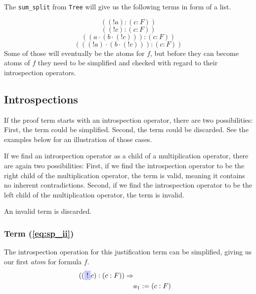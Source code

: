 

The \texttt{sum\_split} from \texttt{Tree} will give us the following terms in form of a list. 

\begin{equation}\label{eq:sp_i}	
	((!a):(c:F))
\end{equation}
\begin{equation}\label{eq:sp_ii}	
	((!c):(c:F))
\end{equation}	
\begin{equation}\label{eq:sp_iii}	
	((a \cdot(b\cdot (! c))):(c:F))											
\end{equation}
\begin{equation}\label{eq:sp_iv}	
	(((! a)\cdot(b\cdot (! c))):(c:F))												
\end{equation}
Some of those will eventually be the atoms for $f$, but before they can become atoms of $f$ they need to be simplified and checked with regard to their introspection operators.

\subsection{Introspections}
If the proof term starts with an introspection operator, there are two possibilities: First, the term could be simplified. Second, the term could be discarded. See the examples below for an illustration of those cases. 

If we find an introspection operator as a child of a multiplication operator, there are again two possibilities: First, if we find the introspection operator to be the right child of the multiplication operator, the term is valid, meaning it contains no inherent contradictions. Second, if we find the introspection operator to be the left child of the multiplication operator, the term is invalid. 

An invalid term is discarded.

\subsubsection[First term]{Term (\ref{eq:sp_ii})}
The introspection operation for this justification term can be simplified, giving us our first \emph{atom} for formula $f.$
\begin{equation}\label{eq:a_1}
	\begin{split}
	((\tikz[baseline]{\node[fill=blue!20,anchor=base] (t1){$!$};} c):(c:F)) \Rightarrow \\
	& a_1 := (c:F)
	\end{split}
\end{equation}

